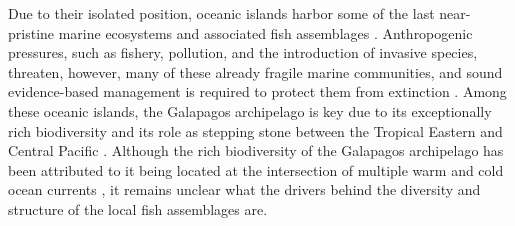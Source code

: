 \documentclass[jmse,article,accept,moreauthors,pdftex]{Definitions/mdpi}
\begin{document}
Due to their isolated position, oceanic islands harbor some of the last near-pristine marine ecosystems and associated fish assemblages \citep{Sandin2008IslandFish,Friedlander2016MarineHotspots}. Anthropogenic pressures, such as fishery, pollution, and the introduction of invasive species, threaten, however, many of these already fragile marine communities, and sound evidence-based management is required to protect them from extinction \citep{Vitousek1988ChapterIslands,Wilson2010HabitatCommunities}. Among these oceanic islands, the Galapagos archipelago is key due to its exceptionally rich biodiversity and its role as stepping stone between the Tropical Eastern and Central Pacific \citep{Edgar2004,Quimbayo2019DeterminantsIslands}. %
Although the rich biodiversity of the Galapagos archipelago has been attributed to it being located at the intersection of multiple warm and cold ocean currents \citep{Palacios2004SeasonalInfluences}, it remains unclear what the drivers behind the diversity and structure of the local fish assemblages are. 
\end{document}
